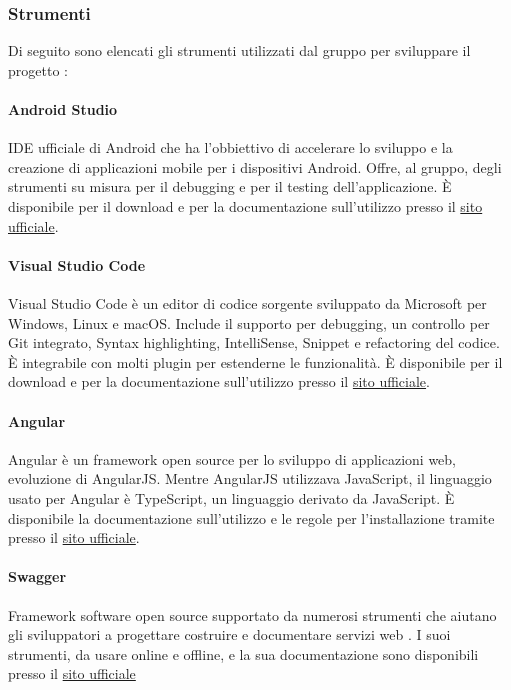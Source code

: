 \subsubsection{Strumenti}
Di seguito sono elencati gli strumenti utilizzati dal gruppo per sviluppare il progetto \glo{\NomeProgetto{}}:

\paragraph{Android Studio}\hbox{}
IDE ufficiale di Android che ha l'obbiettivo di accelerare lo sviluppo e la creazione di applicazioni mobile per i dispositivi Android.
Offre, al gruppo, degli strumenti su misura per il debugging e per il testing dell'applicazione. È disponibile per il download e per la documentazione sull'utilizzo presso il \href{https://developer.android.com/studio}{sito ufficiale}.

\paragraph{Visual Studio Code}\hbox{}
Visual Studio Code è un editor di codice sorgente sviluppato da Microsoft per Windows, Linux e macOS. Include il supporto per debugging, un controllo per Git integrato, Syntax highlighting, IntelliSense, Snippet e refactoring del codice.
È integrabile con molti plugin per estenderne le funzionalità. È disponibile per il download e per la documentazione sull'utilizzo presso il \href{https://code.visualstudio.com/}{sito ufficiale}.

\paragraph{Angular}\hbox{}
Angular è un framework open source per lo sviluppo di applicazioni web, evoluzione di AngularJS. Mentre AngularJS utilizzava JavaScript, il linguaggio usato per Angular è TypeScript, un linguaggio derivato da JavaScript.
È disponibile la documentazione sull'utilizzo e le regole per l'installazione tramite  presso il \href{https://angular.io/}{sito ufficiale}.

\paragraph{Swagger}\hbox{}
Framework software open source supportato da numerosi strumenti che aiutano gli sviluppatori a progettare costruire e documentare servizi web .
I suoi strumenti, da usare online e offline, e la sua documentazione sono disponibili presso il \href{https://swagger.io/}{sito ufficiale}


